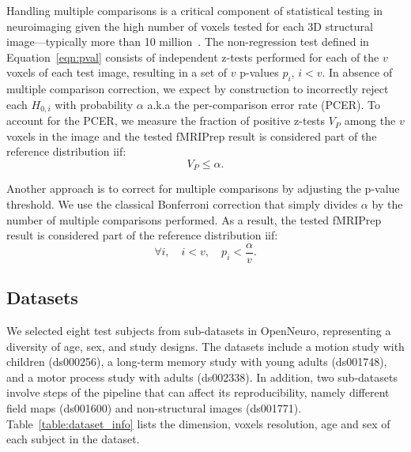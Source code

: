 \documentclass{article}
\newcommand{\fmriprep}{fMRIPrep \xspace}
\begin{document}
Handling multiple comparisons is a critical component of statistical testing in
neuroimaging given the high number of voxels tested for each 3D structural
image---typically more than 10 million~\cite{NICHOLS2007246}. The non-regression
test defined in Equation~\ref{eqn:pval} consists of independent z-tests performed
for each of the $v$ voxels of each test image, resulting in a set of $v$
p-values $p_i$, $i < v$. In absence of multiple comparison correction, we expect
by construction to incorrectly reject each $H_{0,i}$ with probability $\alpha$ a.k.a
the per-comparison error rate (PCER). To account for the PCER, we measure the
fraction of positive z-tests $V_P$ among the $v$ voxels in the image and the
tested \fmriprep result is considered part of the reference distribution iif:
\begin{equation}
    \label{eq:pce}
    V_{P} \leq \alpha.
\end{equation}

Another approach is to correct for multiple comparisons by adjusting the p-value
threshold. We use the classical Bonferroni correction that simply divides
$\alpha$ by the number of multiple comparisons performed. As a result, the
tested \fmriprep result is considered part of the reference distribution iif:
\begin{equation}
    \label{eq:bonferroni}
    \forall i, \quad i < v, \quad p_i < \frac{\alpha}{v}.
\end{equation}



\subsection{Datasets}

We selected eight test subjects from sub-datasets in OpenNeuro, representing a
diversity of age, sex, and study designs. The datasets include a motion study
with children (ds000256), a long-term memory study with young adults (ds001748),
and a motor process study with adults (ds002338). In addition, two sub-datasets
involve steps of the pipeline that can affect its reproducibility, namely
different field maps (ds001600) and non-structural images (ds001771).
Table~\ref{table:dataset_info} lists the dimension, voxels resolution, age and sex of each
subject in the dataset.
\end{document}
